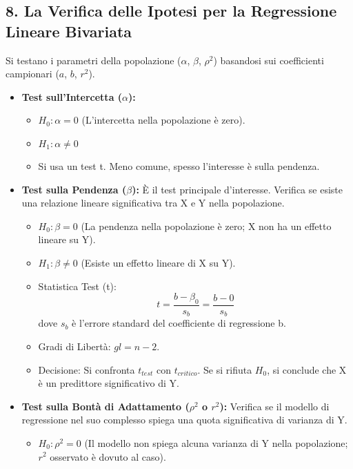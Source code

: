 \documentclass[12pt, a4paper]{article}
\newcommand{\Hnull}{H_0} %
\newcommand{\Halt}{H_1} %
\newcommand{\df}{gl} %
\newcommand{\poprho}{\rho} %
\newcommand{\rsq}{r^2} %
\newcommand{\bcoeff}{b} %
\newcommand{\acoeff}{a} %
\newcommand{\popbeta}{\beta} %
\newcommand{\popalpha}{\alpha} %
\begin{document}
\subsection*{8. La Verifica delle Ipotesi per la Regressione Lineare Bivariata}
Si testano i parametri della popolazione ($\popalpha$, $\popbeta$, $\poprho^2$) basandosi sui coefficienti campionari ($\acoeff$, $\bcoeff$, $\rsq$).
\begin{itemize}
    \item \textbf{Test sull'Intercetta ($\popalpha$):}
        \begin{itemize}
            \item $\Hnull: \popalpha = 0$ (L'intercetta nella popolazione è zero).
            \item $\Halt: \popalpha \neq 0$
            \item Si usa un test t. Meno comune, spesso l'interesse è sulla pendenza.
        \end{itemize}
    \item \textbf{Test sulla Pendenza ($\popbeta$):} È il test principale d'interesse. Verifica se esiste una relazione lineare significativa tra X e Y nella popolazione.
        \begin{itemize}
            \item $\Hnull: \popbeta = 0$ (La pendenza nella popolazione è zero; X non ha un effetto lineare su Y).
            \item $\Halt: \popbeta \neq 0$ (Esiste un effetto lineare di X su Y).
            \item Statistica Test (t):
              $$ t = \frac{\bcoeff - \popbeta_0}{s_{\bcoeff}} = \frac{\bcoeff - 0}{s_{\bcoeff}} $$
              dove $s_{\bcoeff}$ è l'errore standard del coefficiente di regressione b.
            \item Gradi di Libertà: $\df = n - 2$.
            \item Decisione: Si confronta $t_{test}$ con $t_{critico}$. Se si rifiuta $\Hnull$, si conclude che X è un predittore significativo di Y.
        \end{itemize}
    \item \textbf{Test sulla Bontà di Adattamento ($\poprho^2$ o $\rsq$):} Verifica se il modello di regressione nel suo complesso spiega una quota significativa di varianza di Y.
        \begin{itemize}
            \item $\Hnull: \poprho^2 = 0$ (Il modello non spiega alcuna varianza di Y nella popolazione; $\rsq$ osservato è dovuto al caso).

\end{itemize}
\end{itemize}
\end{document}
